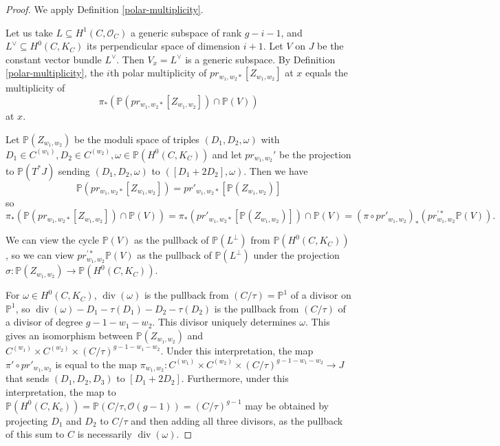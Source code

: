 \documentclass[12pt]{amsart}
\theoremstyle{definition}
\theoremstyle{remark}
\def \div {\operatorname{div}}
\begin{document}
\begin{proof}  We apply Definition \ref{polar-multiplicity}. 

Let us take $L \subseteq  H^1(C, \mathcal O_C)$ a generic subspace of rank $g-i-1$, and $L^\vee \subseteq H^0(C, K_C)$ its perpendicular space of dimension $i+1$. Let $V$ on $J$ be the constant vector bundle $L^\vee$. Then $V_x = L^\vee$ is a generic subspace. By Definition \ref{polar-multiplicity}, the $i$th polar multiplicity of $pr_{w_1,w_2 *} [ Z_{w_1,w_2} ]$ at $x$ equals the multiplicity of \[ \pi_* ( \mathbb P ( pr_{w_1,w_2 *} [ Z_{w_1,w_2} ] ) \cap \mathbb P(V)) \] at $x$.

Let $ \mathbb P ( Z_{w_1,w_2} )$ be the moduli space of triples $(D_1,D_2,\omega)$ with $D_1 \in C^{(w_1)}, D_2\in C^{(w_2)}, \omega \in \mathbb P ( H^0(C, K_C))$ and let $pr_{w_1,w_2}' $ be the projection to $\mathbb P (T^* J)$ sending $(D_1,D_2,\omega)$ to $([D_1+2D_2],\omega)$. Then we have \[ \mathbb P ( pr_{w_1,w_2 *} [ Z_{w_1,w_2} ] ) = pr'_{w_1,w_2 *} [\mathbb P(Z_{w_1,w_2} )] \] so 
\[ \pi_* ( \mathbb P ( pr_{w_1,w_2 *} [ Z_{w_1,w_2} ] ) \cap \mathbb P(V)) = \pi_* (  pr'_{w_1,w_2 *} [\mathbb P(Z_{w_1,w_2} )] ) \cap \mathbb P(V) =( \pi \circ pr'_{w_1,w_2})_* (  pr_{w_1,w_2}^{'*} \mathbb P(V) ).\]

We can view the cycle $\mathbb P(V)$ as the pullback of $\mathbb P(L^\perp)$ from $\mathbb P(H^0(C,K_C))$, so we can view $pr_{w_1,w_2}^{'*} \mathbb P(V)$ as the pullback of $\mathbb P(L^\perp)$ under the projection $\sigma: \mathbb P ( Z_{w_1,w_2} )\to \mathbb P(H^0(C,K_C))$.

For $\omega \in H^0(C, K_C)$, $\div(\omega)$ is the pullback from $(C/\tau)= \mathbb P^1$ of a divisor on $\mathbb P^1$, so $\div(\omega)- D_1 -\tau(D_1) - D_2 -\tau(D_2)$ is the pullback from $(C/\tau)$ of a divisor of degree $g-1-w_1 -w_2$. This divisor uniquely determines $\omega$. This gives an isomorphism between $\mathbb P ( Z_{w_1,w_2}) $ and $C^{(w_1)} \times C^{(w_2)} \times (C/\tau)^{g-1-w_1-w_2}$. Under this interpretation, the map $\pi' \circ  pr'_{w_1,w_2}$ is equal to the map $\pi_{w_1,w_2}:  C^{(w_1)} \times C^{(w_2)} \times (C/\tau)^{g-1-w_1-w_2} \to J$ that sends $(D_1,D_2, D_3) $ to $ [D_1+2D_2] $. Furthermore, under this interpretation, the map to $\mathbb P ( H^0(C, K_c)) = \mathbb P ( C/\tau, \mathcal O(g-1)) = (C/\tau)^{g-1}$ may be obtained by projecting $D_1$ and $D_2$ to $ C/\tau$ and then adding all three divisors, as the pullback of this sum to $C$ is necessarily $\div(\omega)$.


\end{proof}
\end{document}
